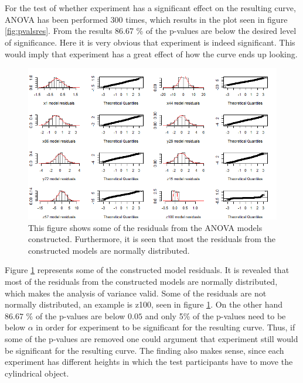 \documentclass[11pt, fleqn, titlepage]{article}
\begin{document}
\\\\
For the test of whether experiment has a significant effect on the resulting curve, ANOVA has been performed 300 times, which results in the plot seen in figure \ref{fig:pvalsres}. From the results 86.67 \% of the p-values are below the desired level of significance. Here it is very obvious that experiment is indeed significant. This would imply that experiment has a great effect of how the curve ends up looking.
\begin{figure}[H]
	\centering
	\includegraphics[width=0.7\linewidth]{billeder/StadigNormalfordeltAF.png}
	\caption{This figure shows some of the residuals from the ANOVA models constructed. Furthermore, it is seen that most the residuals from the constructed models are normally distributed. }
	\label{fig:stadignormalfordeltaf}
\end{figure} \noindent \vspace*{-0.1cm}
 Figure \ref{fig:stadignormalfordeltaf} represents some of the constructed model residuals. It is revealed that most of the residuals from the constructed models are normally distributed, which makes the analysis of variance valid. Some of the residuals are not normally distributed, an example is z100, seen in figure \ref{fig:stadignormalfordeltaf}. On the other hand $ 86.67 $ \% of the p-values are below $ 0.05 $ and only 5\% of the p-values need to be below $ \alpha $ in order for experiment to be significant for the resulting curve. Thus, if some of the p-values are removed one could argument that experiment still would be significant for the resulting curve. The finding also makes sense, since each experiment has different heights in which the test participants have to move the cylindrical object. 
\end{document}
